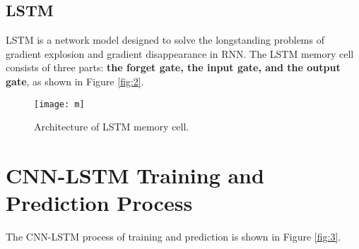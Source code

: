\documentclass[12pt]{article}
\begin{document}
\subsection{LSTM}
LSTM is a network model designed to solve the longstanding problems of gradient explosion and gradient disappearance in RNN. The LSTM memory cell consists of three parts: \textbf{the forget gate, the input gate, and the output gate}, as shown in Figure \ref{fig:2}.

\begin{figure}[h]
\centering
\texttt{[image: m]}
\caption{Architecture of LSTM memory cell.}
\label{fig:model}
\end{figure}
\clearpage

\section{CNN-LSTM Training and Prediction Process}
The CNN-LSTM process of training and prediction is shown in Figure \ref{fig:3}.
\\
\end{document}
